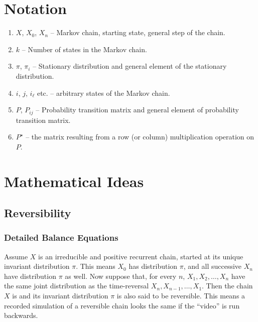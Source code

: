 \documentclass[12pt]{article}
\begin{document}
\section*{Notation}
\begin{enumerate}
    \item
        \( X \), \( X_0 \), \( X_n \) -- Markov chain, starting state,
        general step of the chain.
    \item
        \( k \) -- Number of states in the Markov chain.
    \item
        \( \pi \), \( \pi_i \) -- Stationary distribution and general
        element of the stationary distribution.
    \item
        \( i \), \( j \), \( i_{\ell} \) etc.  -- arbitrary states of
        the Markov chain.
    \item
        \( P \), \( P_{ij} \) -- Probability transition matrix and
        general element of probability transition matrix.
    \item
        \( P^{\star} \) -- the matrix resulting from a row (or column)
        multiplication operation on \( P \).
\end{enumerate}
\hr

\section*{Mathematical Ideas}
\subsection*{Reversibility}

\subsubsection*{Detailed Balance Equations}

Assume \( X \) is an irreducible and positive recurrent chain, started
at its unique invariant distribution \( \pi \).  This means \( X_0 \)
has distribution \( \pi \), and all successive \( X_n \) have
distribution \( \pi \) as well. Now suppose that, for every \( n \), \(
X_1, X_2, \dots , X_n \) have the same joint distribution as the
time-reversal \( X_n, X_{n-1}, \dots , X_1 \).  Then the chain \( X \)
is %
%
and its invariant distribution \( \pi \) is also said to be reversible.
This means a recorded simulation of a reversible chain looks the same if
the ``video'' is run backwards.
\end{document}
